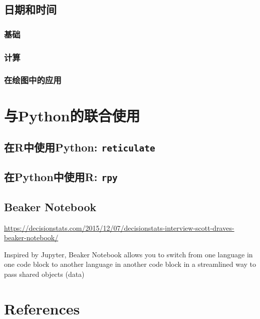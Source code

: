 \documentclass[]{book}
\begin{document}
\hypertarget{dttm}{%
\section{日期和时间}\label{dttm}}

\hypertarget{-3}{%
\subsection{基础}\label{-3}}

\subsection{计算}

\hypertarget{-1}{%
\subsection{在绘图中的应用}\label{-1}}

\hypertarget{python}{%
\chapter{与Python的联合使用}\label{python}}

\hypertarget{reticulate}{%
\section{\texorpdfstring{在R中使用Python: \texttt{reticulate}}{在R中使用Python: reticulate}}\label{reticulate}}

\hypertarget{rpy}{%
\section{\texorpdfstring{在Python中使用R: \texttt{rpy}}{在Python中使用R: rpy}}\label{rpy}}

\hypertarget{beaker}{%
\section{Beaker Notebook}\label{beaker}}

\url{https://decisionstats.com/2015/12/07/decisionstats-interview-scott-draves-beaker-notebook/}

Inspired by Jupyter, Beaker Notebook allows you to switch from one language in one code block to another language in another code block in a streamlined way to pass shared objects (data)

\hypertarget{References}{%
\chapter*{References}\label{References}}
\end{document}
